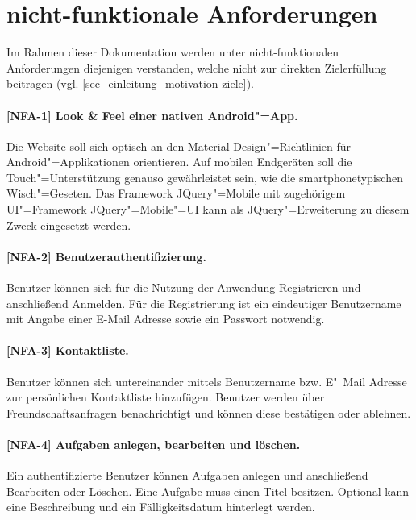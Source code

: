 \section{nicht-funktionale Anforderungen}
\label{sec_anforderungen_nicht-funktionale-anforderungen}

Im Rahmen dieser Dokumentation werden unter nicht-funktionalen Anforderungen diejenigen verstanden, welche nicht zur direkten Zielerfüllung beitragen (vgl. \ref{sec_einleitung_motivation-ziele}).


\paragraph{[NFA-1] Look \& Feel einer nativen Android"=App.} Die Website soll sich optisch an den \glqq Material Design\grqq "=Richtlinien für Android"=Applikationen orientieren. Auf mobilen Endgeräten soll die Touch"=Unterstützung genauso gewährleistet sein, wie die smartphonetypischen Wisch"=Geseten. Das Framework \glqq JQuery"=Mobile\grqq{} mit zugehörigem UI"=Framework \glqq JQuery"=Mobile"=UI\grqq{} kann als JQuery"=Erweiterung zu diesem Zweck eingesetzt werden.

\paragraph{[NFA-2] Benutzerauthentifizierung.} Benutzer können sich für die Nutzung der Anwendung Registrieren und anschließend Anmelden. Für die Registrierung ist ein eindeutiger Benutzername mit Angabe einer E-Mail Adresse sowie ein Passwort notwendig.

\paragraph{[NFA-3] Kontaktliste.} Benutzer können sich untereinander mittels Benutzername bzw. E"~Mail Adresse zur persönlichen Kontaktliste hinzufügen. Benutzer werden über Freundschaftsanfragen benachrichtigt und können diese bestätigen oder ablehnen.

\paragraph{[NFA-4] Aufgaben anlegen, bearbeiten und löschen.} Ein authentifizierte Benutzer können Aufgaben anlegen und anschließend Bearbeiten oder Löschen. Eine Aufgabe muss einen Titel besitzen. Optional kann eine Beschreibung und ein Fälligkeitsdatum hinterlegt werden.

